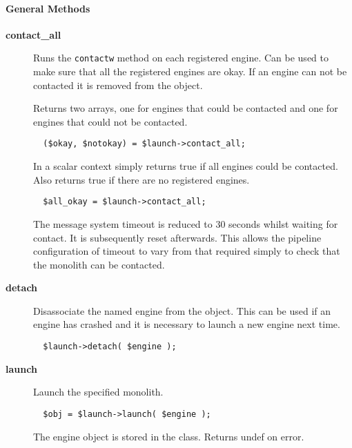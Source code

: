 \paragraph*{General Methods\label{ORAC::Msg::EngineLaunch_General_Methods}}\begin{description}
\item[\textbf{contact\_all}] \mbox{}

Runs the \texttt{contactw} method on each registered engine. Can be used
to make sure that all the registered engines are okay.
If an engine can not be contacted it is removed from the object.



Returns two arrays, one for engines that could be contacted and
one for engines that could not be contacted.

\begin{verbatim}
  ($okay, $notokay) = $launch->contact_all;
\end{verbatim}


In a scalar context simply returns true if all engines could be
contacted. Also returns true if there are no registered engines.

\begin{verbatim}
  $all_okay = $launch->contact_all;
\end{verbatim}


The message system timeout is reduced to 30 seconds whilst
waiting for contact. It is subsequently reset afterwards. This
allows the pipeline configuration of timeout to vary from that
required simply to check that the monolith can be contacted.

\item[\textbf{detach}] \mbox{}

Disassociate the named engine from the object. This can be used
if an engine has crashed and it is necessary to launch a new
engine next time.

\begin{verbatim}
  $launch->detach( $engine );
\end{verbatim}
\item[\textbf{launch}] \mbox{}

Launch the specified monolith.

\begin{verbatim}
  $obj = $launch->launch( $engine );
\end{verbatim}


The engine object is stored in the class.  Returns undef on error.




\end{description}
